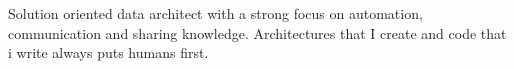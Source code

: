 \documentclass[letter,10pt]{article}
\begin{document}
Solution oriented data architect with a strong focus on automation, communication and sharing knowledge. Architectures that I create and code that i write always puts humans first.
\end{document}
